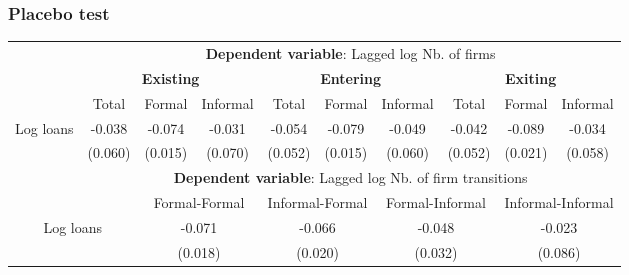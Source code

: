 \documentclass[aspectratio=169]{beamer}
\begin{document}
\begin{frame}[noframenumbering]
\frametitle{\textbf{Placebo test}} \label{placebo}

\begin{center}
    \scriptsize
    \begin{tabular}{lccccccccc}
        \toprule
        & \multicolumn{9}{c}{\textbf{Dependent variable}: Lagged log Nb. of firms} \\
        \cmidrule(lr){2-10}
         & \multicolumn{3}{c}{\textbf{Existing}} & \multicolumn{3}{c}{\textbf{Entering}} & \multicolumn{3}{c}{\textbf{Exiting}} \\
        \cmidrule(lr){2-10}
        & Total 
        & Formal 
        & \multicolumn{1}{c}{Informal}
        & Total 
        & Formal 
        & \multicolumn{1}{c}{Informal}
        & Total 
        & Formal 
        & Informal \\
        \midrule
        Log loans 
        &  -0.038  & -0.074  & -0.031   &  -0.054  & -0.079   & -0.049  & -0.042   & -0.089   & -0.034 \\
        & (0.060) & (0.015) & (0.070) & (0.052) & (0.015) & (0.060) & (0.052) & (0.021) & (0.058) \\
        \midrule
        
        
        & \multicolumn{9}{c}{\textbf{Dependent variable}: Lagged log Nb. of firm transitions} \\
        \cmidrule(lr){3-10}
        \multicolumn{2}{c}{} & \multicolumn{2}{c}{Formal-Formal} & \multicolumn{2}{c}{Informal-Formal} & \multicolumn{2}{c}{Formal-Informal} & \multicolumn{2}{c}{Informal-Informal} \\
        \midrule 
        \multicolumn{2}{c}{Log loans} & \multicolumn{2}{c}{-0.071} & \multicolumn{2}{c}{-0.066} & \multicolumn{2}{c}{-0.048} & \multicolumn{2}{c}{-0.023} \\
        \multicolumn{2}{c}{} & \multicolumn{2}{c}{(0.018)} & \multicolumn{2}{c}{(0.020)} & \multicolumn{2}{c}{(0.032)} & \multicolumn{2}{c}{(0.086)} \\
        
        \bottomrule
    \end{tabular}
\end{center}

\hyperlink{main_result}{}

\end{frame}

\end{document}
